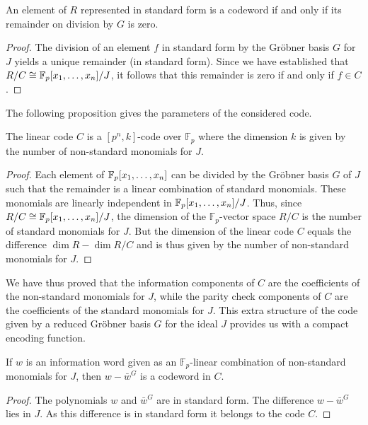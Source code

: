 \documentclass[english,bachelor]{liumaiex}
\begin{document}
\begin{prop}
An element of $R$ represented in standard form is a codeword if and only if its remainder on division by $G$ is zero.
\end{prop}
\begin{proof}
The division of an element $f$ in standard form by the Gröbner basis $G$ for $J$ yields a unique remainder (in standard form). Since we have established that $R/C\cong\mathbb{F}_p[x_1,\dots,x_n]/J$, it follows that this remainder is zero if and only if $f\in C$.
\end{proof}
The following proposition gives the parameters of the considered code.
\begin{prop}
The linear code $C$ is a $[p^n,k]$-code over $\mathbb{F}_p$ where the dimension $k$ is given by the number of non-standard monomials for $J$.
\end{prop}
\begin{proof}
Each element of $\mathbb{F}_p[x_1,\dots,x_n]$ can be divided by the Gröbner basis $G$ of $J$ such that the remainder is a linear combination of standard monomials. These monomials are linearly independent in $\mathbb{F}_p[x_1,\dots,x_n]/J$. Thus, since $R/C\cong\mathbb{F}_p[x_1,\dots,x_n]/J$, the dimension of the $\mathbb{F}_p$-vector space $R/C$ is the number of standard monomials for $J$. But the dimension of the linear code $C$ equals the difference $\dim R-\dim R/C$ and is thus given by the number of non-standard monomials for $J$.
\end{proof}
We have thus proved that the information components of $C$ are the coefficients of the non-standard monomials for $J$, while the parity check components of $C$ are the coefficients of the standard monomials for $J$. This extra structure of the code given by a reduced Gröbner basis $G$ for the ideal $J$ provides us with a compact encoding function.
\begin{prop}
If $w$ is an information word given as an $\mathbb{F}_p$-linear combination of non-standard monomials for $J$, then $w-\bar{w}^G$ is a codeword in $C$.
\end{prop}
\begin{proof}
The polynomials $w$ and $\bar{w}^G$ are in standard form. The difference $w-\bar{w}^G$ lies in $J$. As this difference is in standard form it belongs to the code $C$.
\end{proof}
\end{document}

